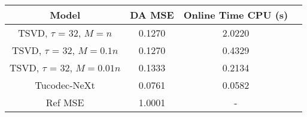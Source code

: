 \begin{tabular}{cccc}
\toprule
Model & DA MSE & Online Time CPU (s) \\ \midrule
TSVD, $\tau$ = 32, $M = n$ & 0.1270 & 2.0220  \\
TSVD, $\tau$ = 32, $M = 0.1n$ & 0.1270 & 0.4329 \\
TSVD, $\tau$ = 32, $M = 0.01n$ & 0.1333 & 0.2134 \\
Tucodec-NeXt  & 0.0761 & 0.0582  \\
\hline
Ref MSE  & 1.0001 & -   \\ \bottomrule
\end{tabular}